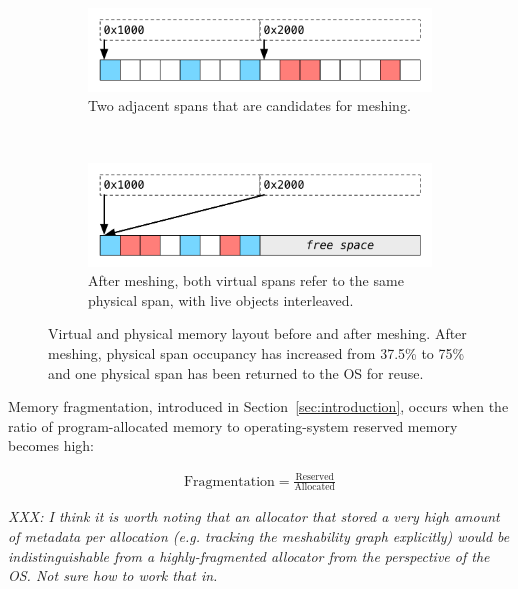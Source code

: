 \begin{figure}[!t]
  \centering
  \begin{subfigure}[t]{.5\textwidth}
    \centering
    \includegraphics[width=\textwidth]{figures/before_meshing}
    \caption{Two adjacent spans that are candidates for meshing.}
  \end{subfigure}%
  ~

  \begin{subfigure}[t]{.5\textwidth}
    \centering
    \includegraphics[width=\textwidth]{figures/after_meshing}
    \caption{After meshing, both virtual spans refer to the same
      physical \newline span, with live objects interleaved.}
  \end{subfigure}
  \caption{Virtual and physical memory layout before and after
    meshing.  After meshing, physical span occupancy has increased
    from 37.5\% to 75\% and one physical span has been returned to the
    OS for reuse.}
  \label{fig:meshing}
\end{figure}


Memory fragmentation, introduced in Section~\ref{sec:introduction},
occurs when the ratio of program-allocated memory to operating-system
reserved memory becomes high:

\begin{align*}
\text{Fragmentation} = \frac{\text{Reserved}}{\text{Allocated}}
\end{align*}

\textit{XXX: I think it is worth noting that an allocator that stored
  a very high amount of metadata per allocation (e.g. tracking the
  meshability graph explicitly) would be indistinguishable from a
  highly-fragmented allocator from the perspective of the OS.  Not
  sure how to work that in.}

